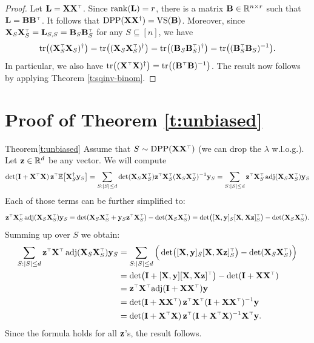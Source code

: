 \documentclass[12pt]{sty/colt2019/colt2018-arxiv}
\begin{document}
     \begin{proof}
       Let $\L=\X\X^\top$. Since $\mathrm{rank}(\mathbf{L})=r$, there is a matrix
       $\mathbf B\in\mathbb R^{n\times r}$ such that $\L=\B\B^\top$. It follows that
       ${\mathrm{DPP}}(\mathbf X\mathbf X^\dagger)={\mathrm{VS}}(\mathbf B)$. Moreover, since
       $\X_S\X_S^\top=\L_{S,S}=\B_S\B_S^\top$ for any $S\subseteq [n]$, we have
       \begin{align*}
         \tr\big((\X_S^\top\X_S)^\dagger\big) =
         \tr\big((\X_S\X_S^\top)^\dagger\big) =
         \tr\big((\B_S\B_S^\top)^\dagger\big) = \tr\big((\B_S^\top\B_S)^{-1}\big).
       \end{align*}
       In particular, we also have $\tr\big((\X^\top\X)^\dagger\big) =
       \tr\big((\B^\top\B)^{-1}\big)$. The result now follows by
       applying Theorem \ref{t:sqinv-binom}.
     \end{proof}

\section{Proof of Theorem \ref{t:unbiased}}
   \begin{proofof}{Theorem}{\ref{t:unbiased}}
Assume that $S\sim\DPP(\X\X^\top)$ (we can drop the $\lambda$
w.l.o.g.).  Let $\mathbf z\in\mathbb R^{d}$ be any vector. We will compute 
     \begin{align*}
       \det(\I+\X^\top\X)\,\z^\top\E\big[\X_S^\dagger\y_S\big] =
       \sum_{S:|S|\leq
       d}\det(\X_S\X_S^\top)\z^\top\X_S^\top(\X_S\X_S^\top)^{-1}\y_S
       =
\sum_{S:|S|\leq
       d}\z^\top\X_S^\top\adj(\X_S\X_S^\top)\y_S
     \end{align*}
     Each of those terms can be further simplified to:
  \begin{align*}
\z^\top\X_S^\top\adj(\X_S\X_S^\top)\y_S =
    \det(\X_S\X_S^\top+\y_S\z^\top\X_S^\top) - \det(\X_S\X_S^\top)
    =\det\!\big([\X,\y]_S[\X,\X\z]_S^\top\big) - \det(\X_S\X_S^\top).
  \end{align*}
  Summing up over $S$ we obtain:
  \begin{align*}
    \sum_{S:|S|\leq d}\z^\top\X^\top\adj(\X_S\X_S^\top)\y_S
    & =
    \sum_{S:|S|\leq d} \Big(\det\!\big([\X,\y]_S[\X, \X\z]_S^\top\big) -
\det(\X_S\X_S^\top)\Big) \\
&= \det\!\big(\I+[\X,\y][\X, \X\z]^\top\big) -\det(\I + \X\X^\top)\\
&= \z^\top\X^\top\!\adj(\I + \X\X^\top)\y \\
    &=\det(\I+\X\X^\top)\,\z^\top\X^\top(\I+\X\X^\top)^{-1}\y\\
    &=\det(\I+\X^\top\X)\,\z^\top(\I+\X^\top\X)^{-1}\X^\top\y.
  \end{align*}
  Since the formula holds for all $\mathbf z$'s, the result follows.
   \end{proofof}



   
\end{document}
